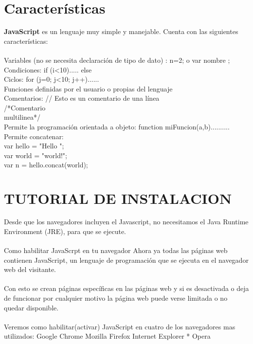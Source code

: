 \documentclass[11pt]{article} %
\begin{document}
\section{Características}
{\bfseries JavaScript} es un lenguaje muy simple y manejable. Cuenta con las siguientes características:\\\\
Variables (no se necesita declaración de tipo de dato) : n=2; o var nombre ;\\
Condiciones: if (i<10){.....} else{}\\
Ciclos: for (j=0; j<10; j++){......}\\
Funciones definidas por el usuario o propias del lenguaje\\
Comentarios: // Esto es un comentario de una línea\\
/*Comentario\\
multilinea*/   \\
Permite la programación orientada a objeto: function miFuncion(a,b){..........} \\
Permite concatenar:\\
var hello = "Hello "; \\
var world = "world!";\\
var n = hello.concat(world);

\section{TUTORIAL DE INSTALACION}
 Desde que los navegadores incluyen el Javascript, no necesitamos el Java Runtime Environment (JRE), para que se ejecute.
\\  \\
Como habilitar JavaScrpt en tu navegador 
Ahora ya todas las páginas web contienen  JavaScript, un lenguaje de programación que se ejecuta en el navegador web del visitante. \\\\
Con esto se crean páginas específicas en las páginas web y si es desactivada o deja de funcionar por cualquier motivo la página web puede verse limitada o no quedar disponible.
\\\\
Veremos como habilitar(activar) JavaScript en cuatro de los navegadores mas utilizados:
\newline
\newline* Google Chrome
\newline* Mozilla Firefox
\newline* Internet Explorer
\newline
* Opera
\end{document}

